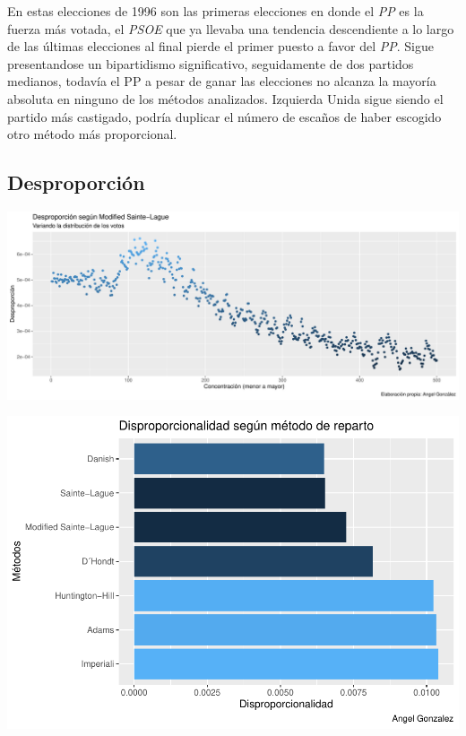 \documentclass[12pt,a4paper,]{book}
\numberwithin{dummy}{section}
\theoremstyle{ocrenumbox}
\theoremstyle{blacknumex}
\theoremstyle{blacknumbox}
\theoremstyle{ocrenum}
\theoremstyle{ocrenum}
\begin{document}
En estas elecciones de 1996 son las primeras elecciones en donde el
\emph{PP} es la fuerza más votada, el \emph{PSOE} que ya llevaba una
tendencia descendiente a lo largo de las últimas elecciones al final
pierde el primer puesto a favor del \emph{PP}. Sigue presentandose un
bipartidismo significativo, seguidamente de dos partidos medianos,
todavía el PP a pesar de ganar las elecciones no alcanza la mayoría
absoluta en ninguno de los métodos analizados. Izquierda Unida sigue
siendo el partido más castigado, podría duplicar el número de escaños de
haber escogido otro método más proporcional.

\hypertarget{desproporciuxf3n-6}{%
\subsection{Desproporción}\label{desproporciuxf3n-6}}

\begin{center}\includegraphics[width=1\linewidth]{figurasR/unnamed-chunk-24-1} \end{center}

\begin{center}\includegraphics[width=1\linewidth]{figurasR/unnamed-chunk-24-2} \end{center}
\end{document}
